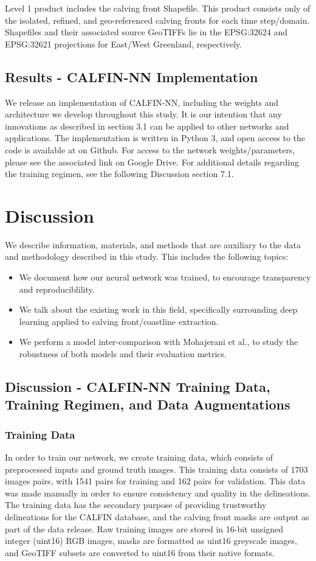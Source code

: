 \documentclass[tc, manuscript]{copernicus}
\begin{document}
Level 1 product includes the calving front Shapefile. This product consists only of the isolated, refined, and geo-referenced calving fronts for each time step/domain. Shapefiles and their associated source GeoTIFFs lie in the EPSG:32624 and EPSG:32621 projections for East/West Greenland, respectively.

\subsection{Results - CALFIN-NN Implementation}
We release an implementation of CALFIN-NN, including the weights and architecture we develop throughout this study. It is our intention that any innovations as described in section 3.1 can be applied to other networks and applications. The implementation is written in Python 3, and open access to the code is available at on Github. For access to the network weights/parameters, please see the associated link on Google Drive. For additional details regarding the training regimen, see the following Discussion section 7.1.


\section{Discussion}
We describe information, materials, and methods that are auxiliary to the data and methodology described in this study. This includes the following topics:
\begin{itemize}
    \item We document how our neural network was trained, to encourage transparency and reproduciblility.
    \item We talk about the existing work in this field, specifically surrounding deep learning applied to calving front/coastline extraction.
    \item We perform a model inter-comparison with Mohajerani et al., to study the robustness of both models and their evaluation metrics.
\end{itemize}

\subsection{Discussion - CALFIN-NN Training Data, Training Regimen, and Data Augmentations}

\subsubsection{Training Data}
In order to train our network, we create training data, which consists of preprocessed inputs and ground truth images. This training data consists of 1703 images pairs, with 1541 pairs for training and 162 pairs for validation. This data was made manually in order to ensure consistency and quality in the delineations. The training data has the secondary purpose of providing trustworthy delineations for the CALFIN database, and the calving front masks are output as part of the data release. Raw training images are stored in 16-bit unsigned integer (uint16) RGB images, masks are formatted as uint16 greyscale images, and GeoTIFF subsets are converted to uint16 from their native formats.
\end{document}
